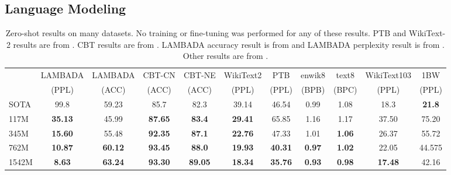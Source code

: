 \documentclass{article}
\begin{document}
\subsection{Language Modeling}

\begin{table}[t]
\begin{center}
\begin{small}
\begin{tabular}{lcccccccccc}
\toprule
& LAMBADA & LAMBADA & CBT-CN & CBT-NE & WikiText2 & PTB & enwik8 & text8 & WikiText103 & 1BW  \\
 & {\scriptsize(PPL)} & {\scriptsize(ACC)} & {\scriptsize(ACC)} & {\scriptsize(ACC)} & {\scriptsize(PPL)} & {\scriptsize(PPL)} & {\scriptsize(BPB)} & {\scriptsize(BPC)} & {\scriptsize(PPL)} & {\scriptsize(PPL)} \\
\midrule
SOTA & 99.8 & 59.23 & 85.7 & 82.3 & 39.14 & 46.54 & 0.99 & 1.08 & 18.3 & \bf{21.8} \\
\midrule
117M & \bf{35.13} & 45.99 & \bf{87.65} & \bf{83.4} & \bf{29.41} & 65.85 & 1.16 & 1.17 & 37.50 & 75.20 \\
345M & \bf{15.60} & 55.48 & \bf{92.35} & \bf{87.1} & \bf{22.76} & 47.33 & 1.01 & \bf{1.06} & 26.37 & 55.72 \\
762M & \bf{10.87} & \bf{60.12} & \bf{93.45} & \bf{88.0} & \bf{19.93} & \bf{40.31} & \bf{0.97} & \bf{1.02} & 22.05 & 44.575 \\
1542M & \bf{8.63} & \bf{63.24} & \bf{93.30} & \bf{89.05} & \bf{18.34} & \bf{35.76} & \bf{0.93} & \bf{0.98} & \bf{17.48} & 42.16 \\
\bottomrule
\end{tabular}
\end{small}
\caption{Zero-shot results on many datasets. No training or fine-tuning was performed for any of these results. PTB and WikiText-2 results are from \cite{gong2018frage}. CBT results are from \cite{bajgar2016embracing}. LAMBADA accuracy result is from \cite{hoang2018entity} and LAMBADA perplexity result is from \cite{grave2016improving}. Other results are from \cite{dai2019transformer}.}
\label{lm}
\end{center}
\end{table}
\end{document}

